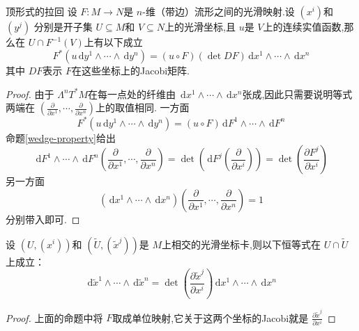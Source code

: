 \documentclass[../../几何与拓扑.tex]{subfiles}
\begin{document}
\begin{proposition}{顶形式的拉回}
    设 $ F:M\to N $是 $ n $-维（带边）流形之间的光滑映射.设 $ \left( x^{i} \right)  $和 $ \left( y^{j} \right)  $  分别是开子集 $ U\subseteq M $和 $ V\subseteq N $上的光滑坐标,且 $ u $是 $ V $上的连续实值函数,那么在 $ U\cap F^{-1} \left( V \right)  $上有以下成立 $$
    F^{*}\left( u\,\mathrm{d} y^{1}\wedge \cdots \wedge \,\mathrm{d} y^{n} \right) = \left( u\circ F \right) \left( \det DF  \right)\,\mathrm{d} x^{1}\wedge \cdots \wedge \,\mathrm{d} x^{n}   
    $$其中 $ DF  $表示 $ F $在这些坐标上的Jacobi矩阵. 
\end{proposition}

\begin{proof}
    由于 $ \Lambda ^{n}T^{*}M $在每一点处的纤维由 $ \,\mathrm{d} x^{1}\wedge \cdots \wedge \,\mathrm{d} x^{n} $张成,因此只需要说明等式两端在 $ \left( \frac{\partial }{\partial x^{1}} ,\cdots ,\frac{\partial }{\partial x^{n}}\right)  $上的取值相同.  
    一方面 $$
    F^{*}\left( u\,\mathrm{d} y^{1}\wedge \cdots \wedge \,\mathrm{d} y^{n} \right)= \left( u\circ F \right) \,\mathrm{d} F^{1}\wedge \cdots \wedge \,\mathrm{d} F^{n}  
    $$ 命题\ref{wedge-property}给出 $$
    \,\mathrm{d} F^{1}\wedge \cdots \wedge \,\mathrm{d} F^{n}\left( \frac{\partial }{\partial x^{1}},\cdots ,\frac{\partial }{\partial x^{n}} \right)  = \det \left( \,\mathrm{d} F^{j}\left( \frac{\partial }{\partial x^{i}} \right)  \right) = \det \left( \frac{\partial F^{j}}{\partial x^{i}} \right)   
    $$另一方面 $$
    \left( \,\mathrm{d} x^{1}\wedge \cdots \wedge \,\mathrm{d} x^{n} \right)\left(  \frac{\partial }{\partial x^{1}},\cdots ,\frac{\partial }{\partial x^{n}} \right) = 1  
    $$分别带入即可.
\end{proof}

\begin{corollary}
    设 $ \left( U,\left( x^{i} \right)  \right)  $和 $ \left( \tilde{U},\left( \tilde{x}^{j} \right)  \right)  $是 $ M $上相交的光滑坐标卡,则以下恒等式在 $ U\cap  \tilde{U} $上成立： $$
    \,\mathrm{d} \tilde{x}^{1}\wedge \cdots \wedge \,\mathrm{d} \tilde{x}^{n} = \det  \left(  \frac{\partial \tilde{x}^{j}}{\partial x^{i}} \right) \,\mathrm{d} x^{1}\wedge \cdots \wedge \,\mathrm{d} x ^{n} 
    $$    
\end{corollary}

\begin{proof}
    上面的命题中将 $ F $取成单位映射,它关于这两个坐标的Jacobi就是 $ \frac{\partial \tilde{x}^{j}}{\partial x^{i}} $  
\end{proof}
\end{document}
